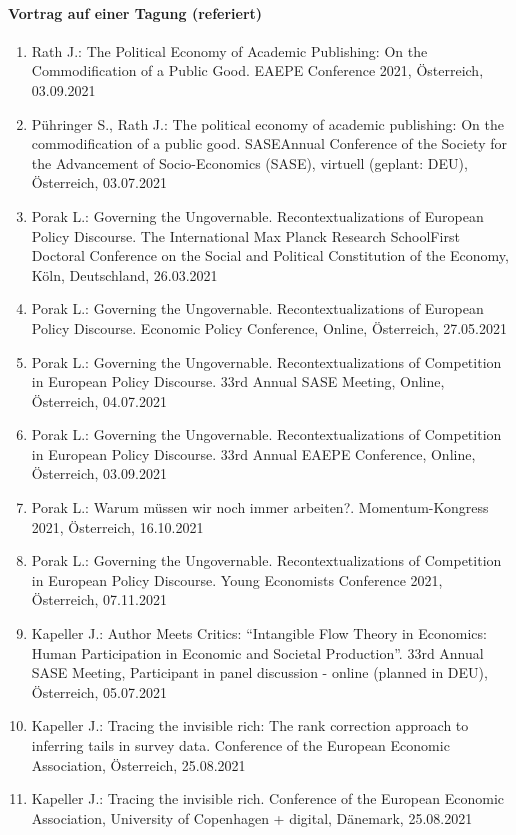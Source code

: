 \paragraph{Vortrag auf einer Tagung (referiert)}
\begin{enumerate}
	\item Rath J.: The Political Economy of Academic Publishing: On the Commodification of a Public Good. EAEPE Conference 2021, Österreich, 03.09.2021
	\item Pühringer S., Rath J.: The political economy of academic publishing: On the commodification of a public good. SASEAnnual Conference of the Society for the Advancement of Socio-Economics (SASE), virtuell (geplant: DEU), Österreich, 03.07.2021
	\item Porak L.: Governing the Ungovernable. Recontextualizations of European Policy Discourse. The International Max Planck Research SchoolFirst Doctoral Conference on the Social and Political Constitution of the Economy, Köln, Deutschland, 26.03.2021
	\item Porak L.: Governing the Ungovernable. Recontextualizations of European Policy Discourse. Economic Policy Conference, Online, Österreich, 27.05.2021
	\item Porak L.: Governing the Ungovernable. Recontextualizations of Competition in European Policy Discourse. 33rd Annual SASE Meeting, Online, Österreich, 04.07.2021
	\item Porak L.: Governing the Ungovernable. Recontextualizations of Competition in European Policy Discourse. 33rd Annual EAEPE Conference, Online, Österreich, 03.09.2021
	\item Porak L.: Warum müssen wir noch immer arbeiten?. Momentum-Kongress 2021, Österreich, 16.10.2021
	\item Porak L.: Governing the Ungovernable. Recontextualizations of Competition in European Policy Discourse. Young Economists Conference 2021, Österreich, 07.11.2021
	\item Kapeller J.: Author Meets Critics: “Intangible Flow Theory in Economics: Human Participation in Economic and Societal Production”. 33rd Annual SASE Meeting, Participant in panel discussion - online (planned in DEU), Österreich, 05.07.2021
	\item Kapeller J.: Tracing the invisible rich: The rank correction approach to inferring tails in survey data. Conference of the European Economic Association, Österreich, 25.08.2021
	\item Kapeller J.: Tracing the invisible rich. Conference of the European Economic Association, University of Copenhagen + digital, Dänemark, 25.08.2021

\end{enumerate}
